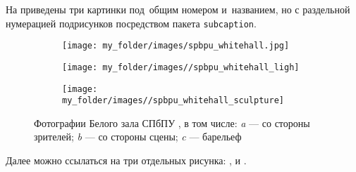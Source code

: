 На  приведены три картинки под~общим номером и~названием, но с раздельной нумерацией подрисунков посредством пакета \verb|subcaption|.
%
\begin{figure}[!htbp]
	\begin{subfigure}[t]{\dimexpr.3\linewidth-1.3em\relax}
		\centering
		\texttt{[image: my\_folder/images/spbpu\_whitehall.jpg]}
	\end{subfigure}
	\hfill %
	\begin{subfigure}[t]{\dimexpr.3\linewidth-1.3em\relax}
		\centering
		\texttt{[image: my\_folder/images//spbpu\_whitehall\_ligh]}
	\end{subfigure}
	\hfill %
	\begin{subfigure}[t]{\dimexpr.3\linewidth-1.3em\relax}
		\centering
		\texttt{[image: my\_folder/images//spbpu\_whitehall\_sculpture]}
	\end{subfigure}%
\captionsetup{justification=centering} %
	\caption{Фотографии Белого зала СПбПУ \cite{spbpu-gallery}, в том числе: {\itshape a} --- со стороны зрителей; {\itshape b} --- со стороны сцены; {\itshape c} --- барельеф}\label{fig:spbpu_whitehall-three-photos}  
\end{figure}

Далее можно ссылаться на три отдельных рисунка: ,  и .